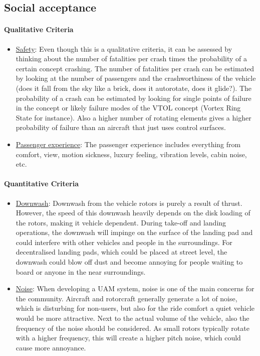 \subsection{Social acceptance}

\paragraph{Qualitative Criteria}

\begin{itemize}
    \item \underline{Safety}: Even though this is a qualitative criteria, it can be assessed by thinking about the number of fatalities per crash times the probability of a certain concept crashing. The number of fatalities per crash can be estimated by looking at the number of passengers and the crashworthiness of the vehicle (does it fall from the sky like a brick, does it autorotate, does it glide?). The probability of a crash can be estimated by looking for single points of failure in the concept or likely failure modes of the VTOL concept (Vortex Ring State for instance). Also a higher number of rotating elements gives a higher probability of failure than an aircraft that just uses control surfaces. 
    \item \underline{Passenger experience}: The passenger experience includes everything from comfort, view, motion sickness, luxury feeling, vibration levels, cabin noise, etc.
\end{itemize}

\paragraph{Quantitative Criteria}

\begin{itemize}
    \item \underline{Downwash}: Downwash from the vehicle rotors is purely a result of thrust. However, the speed of this downwash heavily depends on the disk loading of the rotors, making it vehicle dependent. During take-off and landing operations, the downwash will impinge on the surface of the landing pad and could interfere with other vehicles and people in the surroundings. For decentralised landing pads, which could be placed at street level, the downwash could blow off dust and become annoying for people waiting to board or anyone in the near surroundings. 
    
    \item \underline{Noise}: When developing a UAM system, noise is one of the main concerns for the community. Aircraft and rotorcraft generally generate a lot of noise, which is disturbing for non-users, but also for the ride comfort a quiet vehicle would be more attractive. Next to the actual volume of the vehicle, also the frequency of the noise should be considered. As small rotors typically rotate with a higher frequency, this will create a higher pitch noise, which could cause more annoyance. 
    
\end{itemize}




